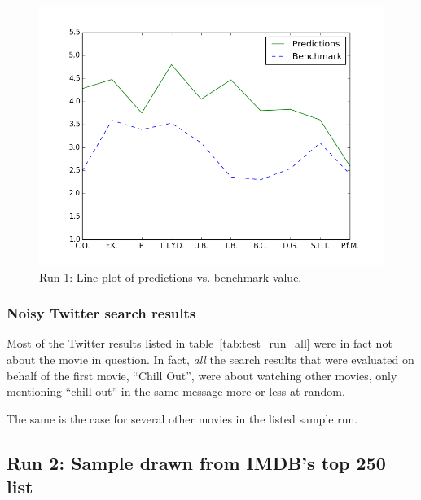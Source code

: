 \begin{figure}[h]
  \centering
    \includegraphics[width=.8\textwidth]{Figures/plots/predictions_benchmark_rand}
  \caption{Run 1: Line plot of predictions vs. benchmark value.}
  \label{fig:predictions_benchmark_rand}
\end{figure}

\subsubsection{Noisy Twitter search results}

Most of the Twitter results listed in table~\ref{tab:test_run_all} were in fact not about the movie in question. In fact, \emph{all} the search results that were evaluated on behalf of the first movie, ``Chill Out'', were about watching other movies, only mentioning ``chill out'' in the same message more or less at random.

The same is the case for several other movies in the listed sample run.

\subsection{Run 2: Sample drawn from IMDB's top 250 list}

